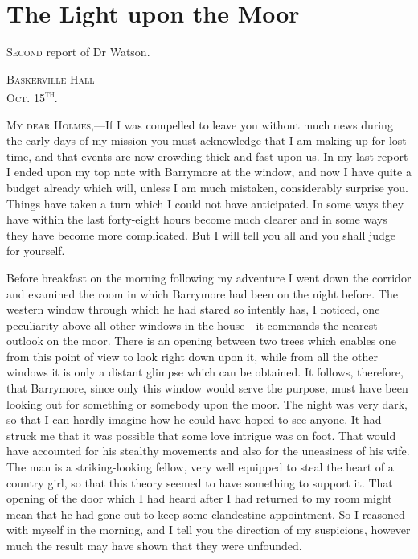 \documentclass[paper=5.5in:8.5in,BCOR=7mm,twoside,DIV=calc,12pt,usegeometry,openany,chapterprefix,endperiod,headings=big]{scrbook} %
\begin{document}
\chapter{The Light upon the Moor}

\lettrine[lines=1]{S}{econd} report of Dr Watson. \\

\hfill\begin{minipage}{0.5\linewidth}\textsc{Baskerville Hall\\Oct. 15\textsuperscript{th}.}\end{minipage}

\textsc{My dear Holmes},---If I was compelled to leave you without much news during the early days of my mission you must acknowledge that I am making up for lost time, and that events are now crowding thick and fast upon us. In my last report I ended upon my top note with Barrymore at the window, and now I have quite a budget already which will, unless I am much mistaken, considerably surprise you. Things have taken a turn which I could not have anticipated. In some ways they have within the last forty-eight hours become much clearer and in some ways they have become more complicated. But I will tell you all and you shall judge for yourself.

Before breakfast on the morning following my adventure I went down the corridor and examined the room in which Barrymore had been on the night before. The western window through \newline which he had stared so intently has, I noticed, one peculiarity above all other windows in the house---it commands the nearest outlook on the moor. There is an opening between two trees which enables one from this point of view to look right down upon it, while from all the other windows it is only a distant glimpse which can be obtained. It follows, therefore, that Barrymore, since only this window would serve the purpose, must have been looking out for something or somebody upon the moor. The night was very dark, so that I can hardly imagine how he could have hoped to see anyone. It had struck me that it was possible that some love intrigue was on foot. That would have accounted for his stealthy movements and also for the uneasiness of his wife. The man is a striking-looking fellow, very well equipped to steal the heart of a country girl, so that this theory seemed to have something to support it. That opening of the door which I had heard after I had returned to my room might mean that he had gone out to keep some clandestine appointment. So I reasoned with myself in the morning, and I tell you the direction of my suspicions, however much the result may have shown that they were unfounded.
\end{document}
